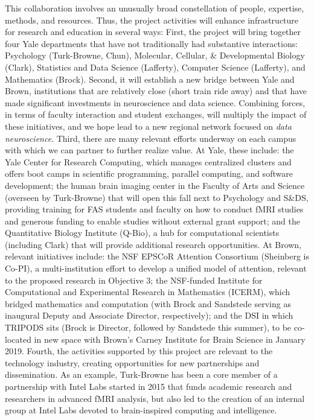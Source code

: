 This collaboration involves an unusually broad constellation of people,
expertise, methods, and resources. Thus, the project activities will
enhance infrastructure for research and education in several ways:
First, the project will bring together four Yale departments that
have not traditionally had substantive interactions: Psychology
(Turk-Browne, Chun), Molecular, Cellular, \& Developmental Biology (Clark),
Statistics and Data Science (Lafferty), Computer Science (Lafferty), and Mathematics (Brock). 
Second, it will establish a
new bridge between Yale and Brown, institutions that are relatively
close (short train ride away) and that have made significant
investments in neuroscience and data science. Combining forces, in terms
of faculty interaction and student exchanges, will multiply the impact
of these initiatives, and we hope lead to a new regional network focused on
\emph{data neuroscience}. Third, there are many relevant efforts underway on
each campus with which we can partner to further realize value. At Yale, these 
include: the Yale Center for Research Computing,
which manages centralized clusters and offers boot camps in scientific
programming, parallel computing, and software development; the human
brain imaging center in the Faculty of Arts and Science (overseen by
Turk-Browne) that will open this fall next to Psychology and S\&DS,
providing training for FAS students and faculty on how to conduct fMRI
studies and generous funding to enable studies without external grant
support; and the Quantitative Biology Institute (Q-Bio), a hub for
computational scientists (including Clark) that will provide additional
research opportunities. At Brown, relevant initiatives include: the NSF
EPSCoR Attention Consortium (Sheinberg is Co-PI), a multi-institution
effort to develop a unified model of attention, relevant to the
proposed research in Objective 3; the NSF-funded Institute for Computational and
Experimental Research in Mathematics (ICERM), which bridged mathematics
and computation (with Brock and Sandstede serving as inaugural Deputy and Associate Director, respectively);
and the DSI in which TRIPODS sits (Brock is
Director, followed by Sandstede this summer), to be co-located in new space with Brown's Carney Institute for Brain Science in January 2019. Fourth, the activities supported by
this project are relevant to the technology industry, creating
opportunities for new partnerships and dissemination. As an example,
Turk-Browne has been a core member of a partnership with Intel Labs
started in 2015 that funds academic research and researchers in advanced
fMRI analysis, but also led to the creation of an internal group at
Intel Labs devoted to brain-inspired computing and intelligence.

